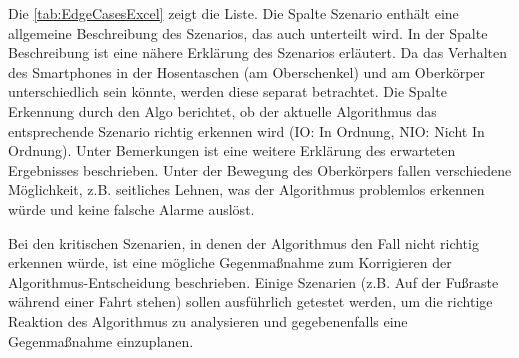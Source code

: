 Die \autoref{tab:EdgeCasesExcel} zeigt die Liste. Die Spalte \glqq Szenario\grqq{} enthält eine allgemeine Beschreibung des Szenarios, das auch unterteilt wird. In der Spalte \glqq Beschreibung\grqq{} ist eine nähere Erklärung des Szenarios erläutert.
Da das Verhalten des Smartphones in der Hosentaschen (am Oberschenkel) und am Oberkörper unterschiedlich sein könnte, werden diese separat betrachtet.
Die Spalte \glqq Erkennung durch den Algo\grqq{} berichtet, ob der aktuelle Algorithmus das entsprechende Szenario richtig erkennen wird (IO: In Ordnung, NIO: Nicht In Ordnung). Unter \glqq Bemerkungen\grqq{} ist eine weitere Erklärung des erwarteten Ergebnisses beschrieben. 
Unter der Bewegung des Oberkörpers fallen verschiedene Möglichkeit, z.B. seitliches Lehnen, was der Algorithmus problemlos erkennen würde und keine falsche Alarme auslöst.

Bei den kritischen Szenarien, in denen der Algorithmus den Fall nicht richtig erkennen würde, ist eine mögliche Gegenmaßnahme zum Korrigieren der Algo\-rithmus-Ent\-scheid\-ung beschrieben.
Einige Szenarien (z.B. Auf der Fußraste während einer Fahrt stehen) sollen ausführlich getestet werden, um die richtige Reaktion des Algorithmus zu analysieren und gegebenenfalls eine Gegenmaßnahme einzuplanen.

